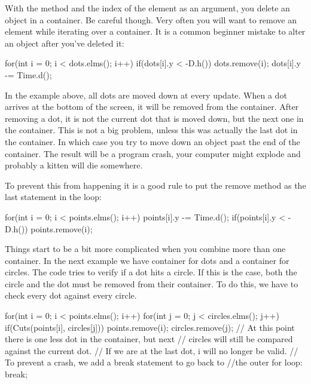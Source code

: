 With the method  and the index of the element as an argument, you delete an object in a container. Be careful though. Very often you will want to remove an element while iterating over a container. It is a common beginner mistake to alter an object after you've deleted it:

\begin{code}
for(int i = 0; i < dots.elms(); i++) {
    if(dots[i].y < -D.h()) {
        dots.remove(i);
	}
	dots[i].y -= Time.d();
}
\end{code}

In the example above, all dots are moved down at every update. When a dot arrives at the bottom of the screen, it will be removed from the container. After removing a dot, it is not the current dot that is moved down, but the next one in the container. This is not a big problem, unless this was actually the last dot in the container. In which case you try to move down an object past the end of the container. The result will be a program crash, your computer might explode and probably a kitten will die somewhere.

To prevent this from happening it is a good rule to put the remove method as the last statement in the loop:

\begin{code}
for(int i = 0; i < points.elms(); i++) {
	points[i].y -= Time.d();
  if(points[i].y < -D.h()) points.remove(i);
}
\end{code}

Things start to be a bit more complicated when you combine more than one container. In the next example we have container for dots and a container for circles. The code tries to verify if a dot hits a circle. If this is the case, both the circle and the dot must be removed from their container. To do this, we have to check every dot against every circle.

\begin{code}
for(int i = 0; i < points.elms(); i++) {
	for(int j = 0; j < circles.elms(); j++) {
	    if(Cuts(points[i], circles[j])) {
		    points.remove(i);
		    circles.remove(j);
		    // At this point there is one less dot in the container, but next 
		    // circles will still be compared against the current dot. 
		    // If we are at the last dot, i will no longer be valid. 
		    // To prevent a crash, we add a break statement to go back to 
		    //the outer for loop:
			break;
		}		
	}
}
\end{code}

